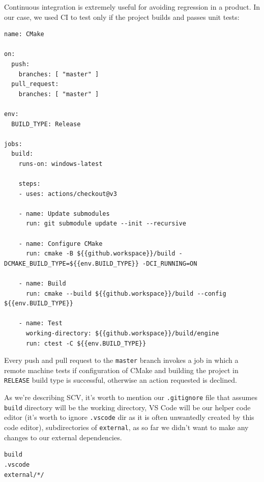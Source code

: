 \label{lst:cicmake}
Continuous integration is extremely useful for avoiding regression in a product. In our case, we used CI to test only if the project builds and passes unit tests:
\begin{lstlisting}[caption=Continuous intergration build test (./.github/workflows/.cmake.yml)]
name: CMake

on:
  push:
    branches: [ "master" ]
  pull_request:
    branches: [ "master" ]

env:
  BUILD_TYPE: Release

jobs:
  build:
    runs-on: windows-latest

    steps:
    - uses: actions/checkout@v3

    - name: Update submodules
      run: git submodule update --init --recursive

    - name: Configure CMake
      run: cmake -B ${{github.workspace}}/build -DCMAKE_BUILD_TYPE=${{env.BUILD_TYPE}} -DCI_RUNNING=ON

    - name: Build
      run: cmake --build ${{github.workspace}}/build --config ${{env.BUILD_TYPE}}

    - name: Test
      working-directory: ${{github.workspace}}/build/engine
      run: ctest -C ${{env.BUILD_TYPE}}
\end{lstlisting}
Every push and pull request to the \texttt{master} branch invokes a job in which a remote machine tests if configuration of CMake and building the project in \texttt{RELEASE} build type is successful, otherwise an action requested is declined.

As we're describing SCV, it's worth to mention our \texttt{.gitignore} file that assumes \texttt{build} directory will be the working directory, VS Code will be our helper code editor (it's worth to ignore \texttt{.vscode} dir as it is often unwantedly created by this code editor), subdirectories of \texttt{external}, as so far we didn't want to make any changes to our external dependencies.
\label{lst:gitignore}
\begin{lstlisting}[caption=\texttt{.gitignore} (./.gitignore)]
build
.vscode
external/*/
\end{lstlisting}